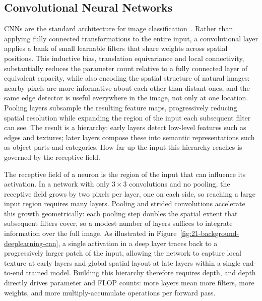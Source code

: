 \subsection{Convolutional Neural Networks} \label{sec:21-background-deeplearning-cnn}
\begin{foldable}
  \Acp{CNN} are the standard architecture for image classification~\cite{lecun1998gradient}.
  Rather than applying fully connected transformations to the entire input, a convolutional layer applies a bank of small learnable filters that share weights across spatial positions.
  This inductive bias, translation equivariance and local connectivity, substantially reduces the parameter count relative to a fully connected layer of equivalent capacity, while also encoding the spatial structure of natural images: nearby pixels are more informative about each other than distant ones, and the same edge detector is useful everywhere in the image, not only at one location.
  Pooling layers subsample the resulting feature maps, progressively reducing spatial resolution while expanding the region of the input each subsequent filter can see.
  The result is a hierarchy: early layers detect low-level features such as edges and textures; later layers compose these into semantic representations such as object parts and categories.
  How far up the input this hierarchy reaches is governed by the receptive field.
\end{foldable}

\begin{foldable}
  The receptive field of a neuron is the region of the input that can influence its activation.
  In a network with only $3\times3$ convolutions and no pooling, the receptive field grows by two pixels per layer, one on each side, so reaching a large input region requires many layers.
  Pooling and strided convolutions accelerate this growth geometrically: each pooling step doubles the spatial extent that subsequent filters cover, so a modest number of layers suffices to integrate information over the full image.
  As illustrated in Figure~\ref{fig:21-background-deeplearning-cnn}, a single activation in a deep layer traces back to a progressively larger patch of the input, allowing the network to capture local texture at early layers and global spatial layout at late layers within a single end-to-end trained model.
  Building this hierarchy therefore requires depth, and depth directly drives parameter and \ac{FLOP} counts: more layers mean more filters, more weights, and more multiply-accumulate operations per forward pass.
\end{foldable}

